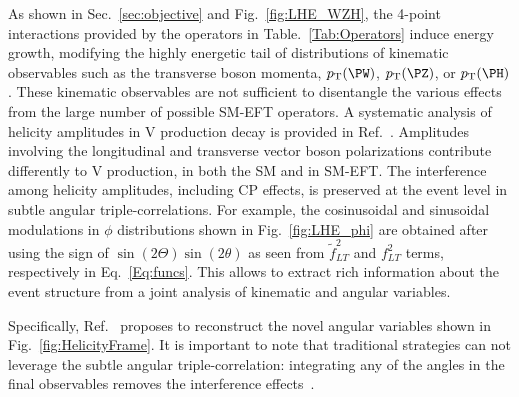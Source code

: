 \documentclass[a4paper,11pt]{article}
\renewcommand{\PV}{{{{V}}}\xspace}
\newcommand{\VH}{{{\PV}{\PH}}\xspace}
\begin{document}
As shown in Sec.~\ref{sec:objective} and Fig.~\ref{fig:LHE_WZH}, the 4-point interactions provided by the operators in Table.~\ref{Tab:Operators} induce  energy growth, modifying the highly energetic tail of distributions of kinematic observables such as the transverse boson momenta, $\pt(\PW)$, $\pt(\PZ)$, or $\pt(\PH)$. 
These kinematic observables are not sufficient to disentangle the various effects from the large number of possible SM-EFT operators. 
A systematic analysis of helicity amplitudes in \VH production decay is provided in Ref.~\cite{Banerjee:2019twi}. 
Amplitudes involving the longitudinal and transverse vector boson polarizations contribute differently to \VH production, in both the SM and in SM-EFT. 
The interference among helicity amplitudes, including CP effects, is preserved at the event level in subtle angular triple-correlations. 
For example, the cosinusoidal and sinusoidal modulations in $\phi$ distributions shown in Fig.~\ref{fig:LHE_phi} are obtained after using the sign of $\sin\left(2\Theta\right)\sin\left(2\theta\right)$ as seen from $\tilde{f}^2_{LT}$ and $f^2_{LT}$ terms, respectively in  Eq.~\ref{Eq:funcs}. 
This allows to extract rich information about the event structure from a joint analysis of kinematic and angular variables.

Specifically, Ref.~\cite{Banerjee:2019twi} proposes to reconstruct the novel angular variables shown in Fig.~\ref{fig:HelicityFrame}. 
It is important to note that traditional strategies can not leverage the subtle angular triple-correlation: integrating any of the angles in the final observables removes the interference effects~\cite{Panico:2017frx}.
\end{document}
